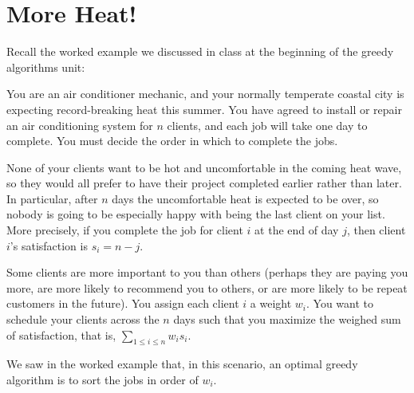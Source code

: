 \documentclass[11pt,fleqn]{exam}
\begin{document}


\section{More Heat!}

Recall the worked example we discussed in class at the beginning of the greedy algorithms unit: 

You are an air conditioner mechanic, and your normally temperate coastal city is expecting record-breaking heat this summer. You have agreed to install or repair an air conditioning system for $n$ clients, and each job will take one day to complete. You must decide the order in which to complete the jobs.

None of your clients want to be hot and uncomfortable in the coming heat wave, so they would all prefer to have their project completed earlier rather than later. In particular, after $n$ days the uncomfortable heat is expected to be over, so nobody is going to be especially happy with being the last client on your list. More precisely, if you complete the job for client $i$ at the end of day $j$, then client $i$'s satisfaction is $s_i = n-j$.

Some clients are more important to you than others (perhaps they are paying you more, are more likely to recommend you to others, or are more likely to be repeat customers in the future). You assign each client $i$ a weight $w_i$. You want to schedule your clients across the $n$ days such that you maximize the weighed sum of satisfaction, that is, $\sum_{1 \le i \le n} w_i s_i$.

We saw in the worked example that, in this scenario, an optimal greedy algorithm is to sort the jobs in order of $w_i$.
\end{document}
